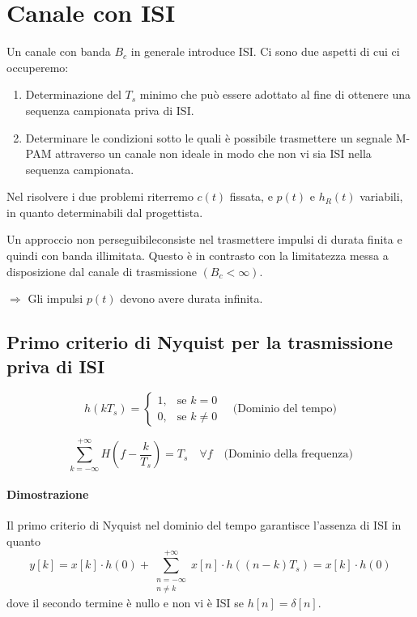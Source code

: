 \documentclass{article}
\begin{document}
\section*{Canale con ISI}

Un canale con banda \( B_c \) in generale introduce ISI. Ci sono due aspetti di cui ci occuperemo:

\begin{enumerate}
    \item Determinazione del \( T_s \) minimo che può essere adottato al fine di ottenere una sequenza campionata priva di ISI.
    \item Determinare le condizioni sotto le quali è possibile trasmettere un segnale M-PAM attraverso un canale non ideale in modo che non vi sia ISI nella sequenza campionata.
\end{enumerate}

Nel risolvere i due problemi riterremo \( c(t) \) fissata, e \( p(t) \) e \( h_R(t) \) variabili, in quanto determinabili dal progettista.

Un approccio non perseguibileconsiste nel trasmettere impulsi di durata finita e quindi con banda illimitata. Questo è in contrasto con la limitatezza messa a disposizione dal canale di trasmissione \( (B_c < \infty) \).

\(\Rightarrow\) Gli impulsi \( p(t) \) devono avere durata infinita.

\subsection*{Primo criterio di Nyquist per la trasmissione priva di ISI}

\[ h(kT_s) = 
    \begin{cases} 
        1, & \text{se } k=0 \\
        0, & \text{se } k \neq 0
    \end{cases}
\quad \text{(Dominio del tempo)}
\]

\[ \sum_{k=-\infty}^{+\infty} H\left(f-\frac{k}{T_s}\right) = T_s \quad \forall f \quad \text{(Dominio della frequenza)} \]




\paragraph*{Dimostrazione}
Il primo criterio di Nyquist nel dominio del tempo garantisce l'assenza di ISI in quanto
\[ y[k] = x[k] \cdot h(0) + \sum_{\substack{n=-\infty \\ n \neq k}}^{+\infty} x[n] \cdot h((n-k)T_s) = x[k] \cdot h(0) \]
dove il secondo termine è nullo e non vi è ISI se \( h[n] = \delta[n] \).
\end{document}
